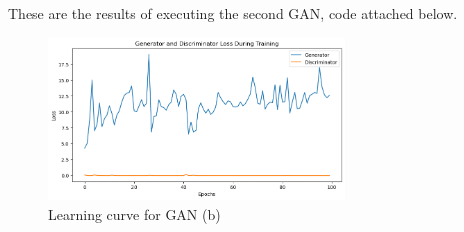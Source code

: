 \documentclass[a4paper]{article}
\theoremstyle{definition}
\newenvironment{soln}{
	\leavevmode\color{blue}\ignorespaces
}{}
\begin{document}
\begin{enumerate} [label=(\alph*)]
		\begin{soln}
			These are the results of executing the second GAN, code attached below.
			\begin{figure}[H]
				\centering
				\includegraphics[width=0.7\textwidth]{2-LearningCurve.png}
				\caption{Learning curve for GAN (b)}
				\label{fig:loss_2}
			\end{figure}
			

\end{soln}
\end{enumerate}
\end{document}
